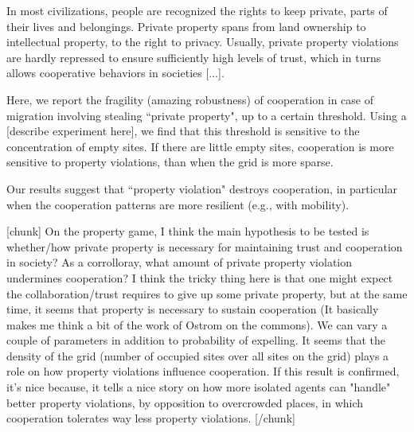 

In most civilizations, people are recognized the rights to keep private, parts of their lives and belongings. Private property spans from land ownership to intellectual property, to the right to privacy. Usually, private property violations are hardly repressed to ensure sufficiently high levels of trust, which in turns allows cooperative behaviors in societies [...].

Here, we report the fragility (amazing robustness) of cooperation in case of migration involving stealing ``private property", up to a certain threshold. Using a [describe experiment here], we find that this threshold is sensitive to the concentration of empty sites. If there are little empty sites, cooperation is more sensitive to property violations, than when the grid is more sparse.


Our results suggest that ``property violation" destroys cooperation, in particular when the cooperation patterns are more resilient (e.g., with mobility).




[chunk] On the property game, I think the main hypothesis to be tested is whether/how private property is necessary for maintaining trust and cooperation in society? As a corrolloray, what amount of private property violation undermines cooperation? I think the tricky thing here is that one might expect the collaboration/trust requires to give up some private property, but at the same time, it seems that property is necessary to sustain cooperation (It basically makes me think a bit of the work of Ostrom on the commons). We can vary a couple of parameters in addition to probability of expelling. It seems that the density of the grid (number of occupied sites over all sites on the grid) plays a role on how property violations influence cooperation. If this result is confirmed, it's nice because, it tells a nice story on how more isolated agents can "handle" better property violations, by opposition to overcrowded places, in which cooperation tolerates way less property violations. [/chunk]